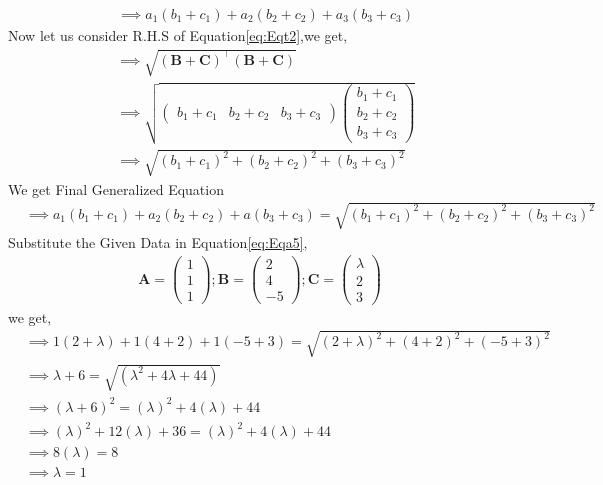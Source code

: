 \documentclass[10pt, a4paper]{article}
\newcommand{\myvec}[1]{\ensuremath{\begin{pmatrix}#1\end{pmatrix}}}
\let\vec\mathbf
\providecommand{\brak}[1]{\ensuremath{\left(#1\right)}}
\providecommand{\sbrak}[1]{\ensuremath{{}\left[#1\right]}}
\begin{document}
\begin{enumerate}
\begin{align}
   &\implies a_1(b_1+c_1)+a_2(b_2+c_2)+a_3(b_3+c_3)
\end{align}
Now let us consider R.H.S of Equation\eqref{eq:Eqt2},we get,
\begin{align}
    &\implies \sqrt{\brak{\vec{B}+\vec{C}}^\top\brak{\vec{B}+\vec{C}}}\\
    &\implies \sqrt{\myvec{b_1+c_1&b_2+c_2&b_3+c_3}\myvec{b_1+c_1\\b_2+c_2\\b_3+c_3}}\\
    &\implies \sqrt{\brak{b_1+c_1}^2+\brak{b_2+c_2}^2+\brak{b_3+c_3}^2}
\end{align}
We get Final Generalized Equation
\begin{align}
     &\implies a_1(b_1+c_1)+a_2(b_2+c_2)+a(b_3+c_3)= \sqrt{\brak{b_1+c_1}^2+\brak{b_2+c_2}^2+\brak{b_3+c_3}^2} \label{eq:Eqa5}
\end{align}
Substitute the Given Data in Equation\eqref{eq:Eqa5},
\begin{align*}
	\vec{A}=\myvec{1\\1\\1};\vec{B}=\myvec{2\\4\\-5};\vec{C}=\myvec{\lambda\\2\\3}
\end{align*}
we get,
\begin{align}   
&\implies 1\brak{2+\lambda}+1\brak{4+2}+1\brak{-5+3}=\sqrt{\brak{2+\lambda}^2+\brak{4+2}^2+\brak{-5+3}^2}\\
& \implies \lambda +6 = \sqrt{\brak{\lambda ^2+4 \lambda +44}}\\
& \implies\brak{ \lambda +6}^2 = \brak{\lambda} ^2+4 \brak{\lambda} +44\\
& \implies \brak{\lambda}^2+12\brak{ \lambda }+36 = \brak{ \lambda }^2+4 \brak{\lambda} +44\\
& \implies  8\brak{\lambda} = 8\\
 &\implies \lambda = 1
\end{align}
\end{enumerate}
\end{document}
